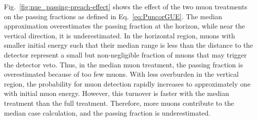 Fig.~\ref{fig:nue_passing-preach-effect} shows the effect of the two muon treatments on the passing fractions as defined in Eq.~\ref{eq:PuncorGUE}.
The median approximation overestimates the passing fraction at the horizon, while near the vertical direction, it is underestimated.
In the horizontal region, muons with smaller initial energy such that their median range is less than the distance to the detector represent a small but non-negligible fraction of muons that may trigger the detector veto.
Thus, in the median muon treatment, the passing fraction is overestimated because of too few muons.
With less overburden in the vertical region, the probability for muon detection rapidly increases to approximately one with initial muon energy.
However, this turnover is faster with the median treatment than the full treatment.
Therefore, more muons contribute to the median case calculation, and the passing fraction is underestimated.


